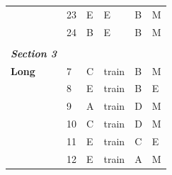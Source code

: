 \documentclass[pageno]{jpaper}
\newcommand{\textbi}[1]{\textbf{\textit{#1}}}
\begin{document}
\begin{table}[]
\begin{tabular}{llllll}
\textbf{}                & 23                                  & E                                          & E                                           & B                                           & M                                       \\
\textbf{}                & 24                                  & B                                          & E                                           & B                                           & M                                       \\
\textbf{}                &                                     &                                            &                                             &                                             &                                         \\ \midrule
\textbi{Section 3}       &                                     &                                            &                                             &                                             &                                         \\ \midrule
\textbf{Long}            & 7                                   & C                                          & train                                       & B                                           & M                                       \\
\textbf{}                & 8                                   & E                                          & train                                       & B                                           & E                                       \\
\textbf{}                & 9                                   & A                                          & train                                       & D                                           & M                                       \\
\textbf{}                & 10                                  & C                                          & train                                       & D                                           & M                                       \\
\textbf{}                & 11                                  & E                                          & train                                       & C                                           & E                                       \\
\textbf{}                & 12                                  & E                                          & train                                       & A                                           & M                                       \\

\end{tabular}
\end{table}
\end{document}
